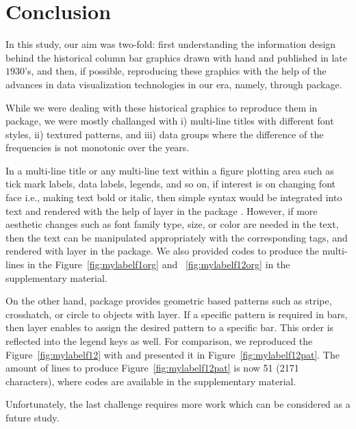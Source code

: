 \section{Conclusion}
\label{sec:conc}

In this study, our aim was two-fold: first understanding the information design behind the historical column bar graphics drawn with hand and published in late $1930$'s, and then, if possible, reproducing these graphics with the help of the advances in data visualization technologies in our era, namely, through  package. 

While we were dealing with these historical graphics to reproduce them in  package, we were mostly challanged with  i) multi-line titles with different font styles, ii) textured patterns, and iii) data groups where the difference of the frequencies is not monotonic over the years. 

In a multi-line title or any multi-line text within a figure plotting area such as tick mark labels, data labels, legends, and so on, if interest is on changing font face i.e., making text bold or italic, then simple   syntax would be integrated into text and rendered with the help of   layer in the  package \citep{ggtext}. However, if more aesthetic changes such as font family type, size, or color are needed in the text, then the text can be manipulated appropriately with the corresponding  tags, and rendered with  layer in the  package. We also provided   codes to produce the multi-lines in the Figure~\ref{fig:mylabelf1org} and ~\ref{fig:mylabelf12org} in the supplementary material. 

On the other hand,  package \citep{pattern} provides geometric based patterns such as stripe, crosshatch,  or circle to objects with  layer. If a specific pattern is required in bars, then   layer enables to assign the desired pattern to a specific bar. This order is reflected into the legend keys as well. For comparison,  we reproduced the Figure~\ref{fig:mylabelf12}  with  and presented it in Figure~\ref{fig:mylabelf12pat}. The amount of lines to produce Figure~\ref{fig:mylabelf12pat}  is now 51 (2171 characters), where 
 codes are available in the supplementary material. 

Unfortunately, the last challenge requires more work which can be considered as a future study.

